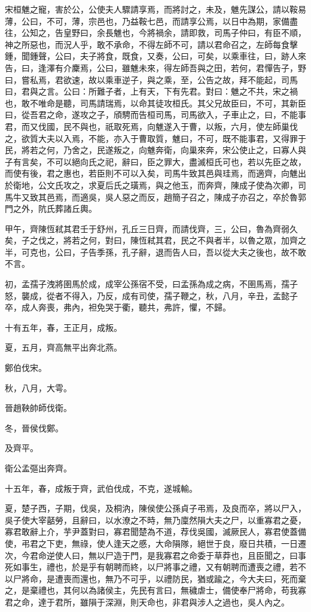 \begin{pinyinscope}
宋桓魋之寵，害於公，公使夫人驟請享焉，而將討之，未及，魋先謀公，請以鞍易薄，公曰，不可，薄，宗邑也，乃益鞍七邑，而請享公焉，以日中為期，家備盡往，公知之，告皇野曰，余長魋也，今將禍余，請即救，司馬子仲曰，有臣不順，神之所惡也，而況人乎，敢不承命，不得左師不可，請以君命召之，左師每食擊鍾，聞鍾聲，公曰，夫子將食，既食，又奏，公曰，可矣，以乘車往，曰，跡人來告，曰，逢澤有介麇焉，公曰，雖魋未來，得左師吾與之田，若何，君憚告子，野曰，嘗私焉，君欲速，故以乘車逆子，與之乘，至，公告之故，拜不能起，司馬曰，君與之言。公曰：所難子者，上有天，下有先君。對曰：魋之不共，宋之禍也，敢不唯命是聽，司馬請瑞焉，以命其徒攻桓氏。其父兄故臣曰，不可，其新臣曰，從吾君之命，遂攻之子，頎騁而告桓司馬，司馬欲入，子車止之，曰，不能事君，而又伐國，民不與也，祇取死焉，向魋遂入于曹，以叛，六月，使左師巢伐之，欲質大夫以入焉，不能，亦入于曹取質，魋曰，不可，既不能事君，又得罪于民，將若之何，乃舍之，民遂叛之，向魋奔衛，向巢來奔，宋公使止之，曰寡人與子有言矣，不可以絕向氏之祀，辭曰，臣之罪大，盡滅桓氏可也，若以先臣之故，而使有後，君之惠也，若臣則不可以入矣，司馬牛致其邑與珪焉，而適齊，向魋出於衛地，公文氏攻之，求夏后氏之璜焉，與之他玉，而奔齊，陳成子使為次卿，司馬牛又致其邑焉，而適吳，吳人惡之而反，趙簡子召之，陳成子亦召之，卒於魯郭門之外，阬氏葬諸丘輿。

甲午，齊陳恆弒其君壬于舒州，孔丘三日齊，而請伐齊，三，公曰，魯為齊弱久矣，子之伐之，將若之何，對曰，陳恆弒其君，民之不與者半，以魯之眾，加齊之半，可克也，公曰，子告季孫，孔子辭，退而告人曰，吾以從大夫之後也，故不敢不言。

初，孟孺子洩將圉馬於成，成宰公孫宿不受，曰孟孫為成之病，不圉馬焉，孺子怒，襲成，從者不得入，乃反，成有司使，孺子鞭之，秋，八月，辛丑，孟懿子卒，成人奔喪，弗內，袒免哭于衢，聽共，弗許，懼，不歸。

十有五年，春，王正月，成叛。

夏，五月，齊高無平出奔北燕。

鄭伯伐宋。

秋，八月，大雩。

晉趙鞅帥師伐衛。

冬，晉侯伐鄭。

及齊平。

衛公孟彄出奔齊。

十五年，春，成叛于齊，武伯伐成，不克，遂城輸。

夏，楚子西，子期，伐吳，及桐汭，陳侯使公孫貞子弔焉，及良而卒，將以尸入，吳子使大宰嚭勞，且辭曰，以水潦之不時，無乃廩然隕大夫之尸，以重寡君之憂，寡君敢辭上介，芋尹蓋對曰，寡君聞楚為不道，荐伐吳國，滅厥民人，寡君使蓋備使，弔君之下吏，無祿，使人逢天之慼，大命隕隊，絕世于良，廢日共積，一日遷次，今君命逆使人曰，無以尸造于門，是我寡君之命委于草莽也，且臣聞之，曰事死如事生，禮也，於是乎有朝聘而終，以尸將事之禮，又有朝聘而遭喪之禮，若不以尸將命，是遭喪而還也，無乃不可乎，以禮防民，猶或踰之，今大夫曰，死而棄之，是棄禮也，其何以為諸侯主，先民有言曰，無穢虐士，備使奉尸將命，苟我寡君之命，達于君所，雖隕于深淵，則天命也，非君與涉人之過也，吳人內之。


\end{pinyinscope}
